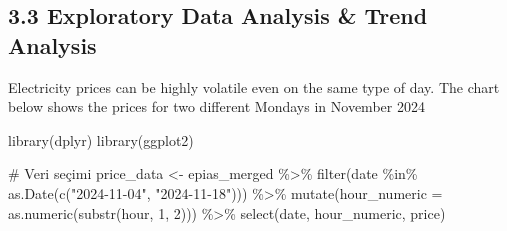 \documentclass[
]{article}
\newenvironment{Shaded}{\begin{snugshade}}{\end{snugshade}}
\newcommand{\AttributeTok}[1]{\textcolor[rgb]{0.40,0.45,0.13}{#1}}
\newcommand{\CommentTok}[1]{\textcolor[rgb]{0.37,0.37,0.37}{#1}}
\newcommand{\DecValTok}[1]{\textcolor[rgb]{0.68,0.00,0.00}{#1}}
\newcommand{\FunctionTok}[1]{\textcolor[rgb]{0.28,0.35,0.67}{#1}}
\newcommand{\NormalTok}[1]{\textcolor[rgb]{0.00,0.23,0.31}{#1}}
\newcommand{\OtherTok}[1]{\textcolor[rgb]{0.00,0.23,0.31}{#1}}
\newcommand{\SpecialCharTok}[1]{\textcolor[rgb]{0.37,0.37,0.37}{#1}}
\newcommand{\StringTok}[1]{\textcolor[rgb]{0.13,0.47,0.30}{#1}}
\begin{document}
\subsection{\texorpdfstring{3.3 \textbf{Exploratory Data Analysis \&
Trend
Analysis}}{3.3 Exploratory Data Analysis \& Trend Analysis}}\label{exploratory-data-analysis-trend-analysis}

Electricity prices can be highly volatile even on the same type of day.
The chart below shows the prices for two different Mondays in November
2024

\begin{Shaded}
\begin{Highlighting}[]
\FunctionTok{library}\NormalTok{(dplyr)}
\FunctionTok{library}\NormalTok{(ggplot2)}

\CommentTok{\# Veri seçimi}
\NormalTok{price\_data }\OtherTok{\textless{}{-}}\NormalTok{ epias\_merged }\SpecialCharTok{\%\textgreater{}\%}
  \FunctionTok{filter}\NormalTok{(date }\SpecialCharTok{\%in\%} \FunctionTok{as.Date}\NormalTok{(}\FunctionTok{c}\NormalTok{(}\StringTok{"2024{-}11{-}04"}\NormalTok{, }\StringTok{"2024{-}11{-}18"}\NormalTok{))) }\SpecialCharTok{\%\textgreater{}\%}
  \FunctionTok{mutate}\NormalTok{(}\AttributeTok{hour\_numeric =} \FunctionTok{as.numeric}\NormalTok{(}\FunctionTok{substr}\NormalTok{(hour, }\DecValTok{1}\NormalTok{, }\DecValTok{2}\NormalTok{))) }\SpecialCharTok{\%\textgreater{}\%}
  \FunctionTok{select}\NormalTok{(date, hour\_numeric, price)}


\end{Highlighting}
\end{Shaded}
\end{document}
